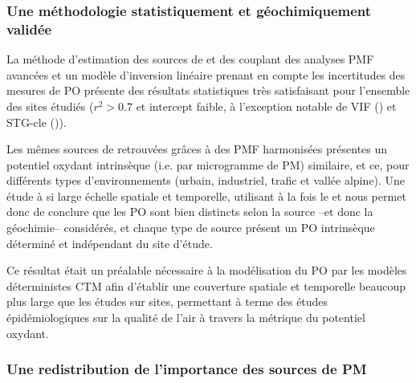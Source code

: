 \subsubsection{Une méthodologie statistiquement et géochimiquement validée}%
\label{ssub:une_méthodologie_statistiquement_et_géochimiquement_validée}

La méthode d'estimation des sources de \POAA{} et \PODTT{} des \PMdix{} couplant des
analyses PMF avancées et un modèle d'inversion linéaire prenant en compte les incertitudes
des mesures de PO présente des résultats statistiques très satisfaisant pour l'ensemble
des sites étudiés ($r^2>0.7$ et intercept faible, à l'exception notable de VIF (\PODTT) et
STG-cle (\POAA)).

Les mêmes sources de \PMdix{} retrouvées grâces à des PMF harmonisées présentes un potentiel
oxydant intrinsèque (i.e. par microgramme de PM) similaire, et ce, pour différents types
d'environnements (urbain, industriel, trafic et vallée alpine). Une étude à si large
échelle spatiale et temporelle, utilisant à la fois le \POAA{} et \PODTT{} nous permet
donc de conclure que les PO sont bien distincts selon la source --et donc la géochimie--
considérés, et chaque type de source présent un PO intrinsèque déterminé et indépendant du
site d'étude.

Ce résultat était un préalable nécessaire à la modélisation du PO par les modèles
déterministes CTM afin d'établir une couverture spatiale et temporelle beaucoup plus
large que les études sur sites, permettant à terme des études épidémiologiques sur la
qualité de l'air à travers la métrique du potentiel oxydant.

\subsubsection{Une redistribution de l'importance des sources de PM}%
\label{ssub:une_redistribution_de_l_importance_des_sources_de_pm}

